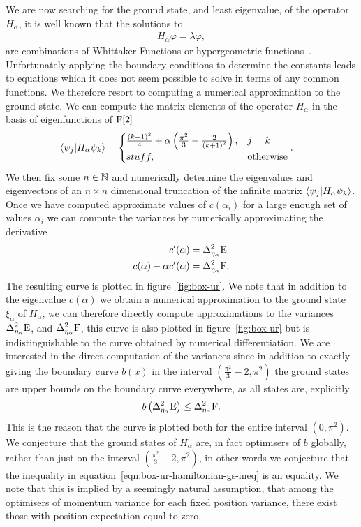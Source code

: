 We are now searching for the ground state, and least eigenvalue, of the operator $H_\alpha$, it is well known that the solutions to
\begin{align}
  H_\alpha\varphi = \lambda \varphi,
\end{align}
are combinations of Whittaker Functions or hypergeometric functions~\cites{Abramowitz-and-Stegun}{Whittaker-and-Watson}. Unfortunately applying the boundary conditions to determine the constants leads to equations which it does not seem possible to solve in terms of any common functions. We therefore resort to computing a numerical approximation to the ground state. We can compute the matrix elements of the operator $H_\alpha$ in the basis of eigenfunctions of $\operatorname{F}[2]$
\begin{align}
  \langle \psi_j|H_\alpha \psi_k\rangle &= \begin{cases}\frac{(k+1)^2}{4} + \alpha\left(\frac{\pi^2}{3} - \frac{2}{\left(k+1\right)^2}\right), & j=k\\ stuff, &\text{otherwise} \end{cases}.
\end{align}
We then fix some $n\in\mathbb{N}$ and numerically determine the eigenvalues and eigenvectors of an $n\times n$ dimensional truncation of the infinite matrix $\langle \psi_j|H_\alpha \psi_k\rangle$. Once we have computed approximate values of $c(\alpha_i)$ for a large enough set of values $\alpha_i$ we can compute the variances by numerically approximating the derivative
\begin{align}
  c^\prime(\alpha) &= \var[\eta_\alpha]{\ope}\\
  c(\alpha) - \alpha c^\prime(\alpha) &= \var[\eta_\alpha]{\opf}.
\end{align}
The resulting curve is plotted in figure~\ref{fig:box-ur}. We note that in addition to the eigenvalue $c(\alpha)$ we obtain a numerical approximation to the ground state $\xi_\alpha$ of $H_\alpha$, we can therefore directly compute approximations to the variances $\var[\eta_\alpha]{\ope}$, and $\var[\eta_\alpha]{\opf}$, this curve is also plotted in figure~\ref{fig:box-ur} but is indistinguishable to the curve obtained by numerical differentiation. We are interested in the direct computation of the variances since in addition to exactly giving the boundary curve $b(x)$ in the interval $\left(\frac{\pi^2}{3} -2, \pi^2\right)$ the ground states are upper bounds on the boundary curve everywhere, as all states are, explicitly
\begin{align}\label{eqn:box-ur-hamiltonian-gs-ineq}
  b\left(\var[\eta_\alpha]{\ope}\right) \leq \var[\eta_\alpha]{\opf}.
\end{align}
This is the reason that the curve is plotted both for the entire interval $(0, \pi^2)$. We conjecture that the ground states of $H_\alpha$ are, in fact optimisers of $b$ globally, rather than just on the interval $\left(\frac{\pi^2}{3} -2, \pi^2\right)$, in other words we conjecture that the inequality in equation~\ref{eqn:box-ur-hamiltonian-gs-ineq} is an equality. We note that this is implied by a seemingly natural assumption, that among the optimisers of momentum variance for each fixed position variance, there exist those with position expectation equal to zero.

